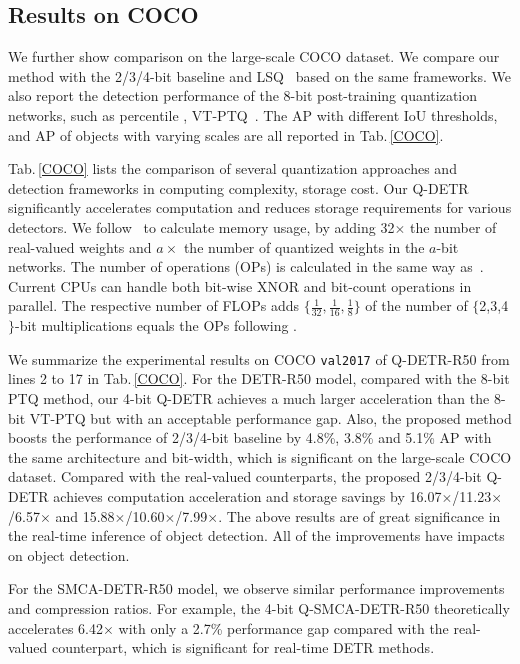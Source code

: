 \documentclass[10pt,twocolumn,letterpaper]{article}
\begin{document}
\subsection{Results on COCO}

We further show comparison on the large-scale COCO \cite{coco2014} dataset. We compare our method with the 2/3/4-bit baseline and  LSQ~\cite{esser2019learned} based on the same frameworks. We also report the detection performance of the 8-bit post-training quantization networks, such as percentile \cite{lin2021fq} , VT-PTQ~\cite{liu2021post}. The AP with different IoU thresholds, and AP of objects with varying scales are all reported in Tab.\,\ref{COCO}. 

Tab.\,\ref{COCO} lists the comparison of several quantization approaches and detection frameworks in computing complexity, storage cost. Our Q-DETR significantly accelerates computation and reduces storage requirements for various detectors. 
We follow~\cite{wang2020bidet} to calculate memory usage, by adding 32$\times$ the number of real-valued weights and $a\times$ the number of quantized weights in the $a$-bit networks. 
The number of operations (OPs) is calculated in the same way as~\cite{wang2020bidet}. Current CPUs can handle both bit-wise XNOR and bit-count operations in parallel. The respective number of FLOPs adds $\{\frac{1}{32},\frac{1}{16},\frac{1}{8}\}$ of the number of $\{$2,3,4$\}$-bit multiplications equals the OPs following \cite{liu2020bi}. 

We summarize the experimental results on COCO {\tt val2017} of Q-DETR-R50 from lines 2 to 17 in Tab.\,\ref{COCO}. For the DETR-R50 model, compared with the 8-bit PTQ method, our 4-bit Q-DETR achieves a much larger acceleration than the 8-bit VT-PTQ but with an acceptable performance gap. Also, the proposed method boosts the performance of 2/3/4-bit baseline by 4.8\%, 3.8\% and 5.1\% AP with the same architecture and bit-width, which is significant on the large-scale COCO dataset. Compared with the real-valued counterparts, the proposed 2/3/4-bit Q-DETR achieves computation acceleration and storage savings by 16.07$\times$/11.23$\times$/6.57$\times$ and 15.88$\times$/10.60$\times$/7.99$\times$. The above results are of great significance in the real-time inference of object detection. All of the improvements have impacts on object detection.


For the SMCA-DETR-R50 model, we observe similar performance improvements and compression ratios. For example, the 4-bit Q-SMCA-DETR-R50 theoretically accelerates 6.42$\times$ with only a 2.7\% performance gap compared with the real-valued counterpart, which is significant for real-time DETR methods.
\end{document}
